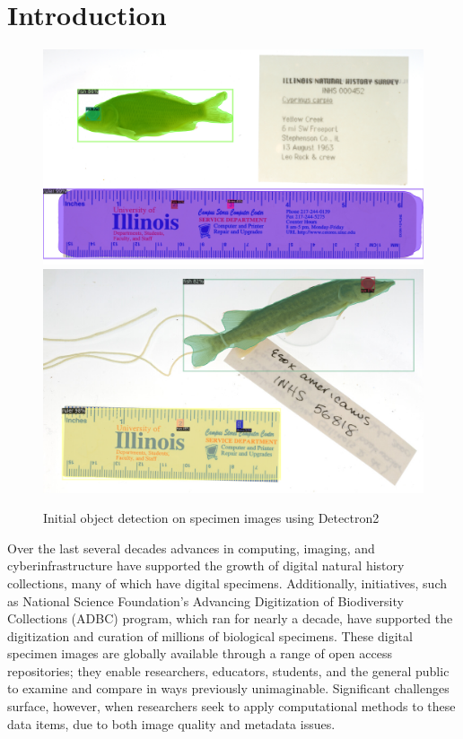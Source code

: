 \documentclass[conference]{IEEEtran}
\begin{document}
\section{Introduction}
\begin{figure}[H]
  \centering
  \includegraphics[width=.45\textwidth]{images/teaser1_crop}
  \hspace{4mm}
  \includegraphics[width=.45\textwidth]{images/teaser2_crop}
  \caption{Initial object detection on specimen images using Detectron2~\cite{wu2019detectron2}}
  \label{fig:teaser}
\end{figure}
Over the last several decades advances in computing, imaging, and cyberinfrastructure have supported the growth of digital natural history collections, many of which have digital specimens. Additionally, initiatives, such as National Science Foundation’s Advancing Digitization of Biodiversity Collections (ADBC) program, which ran for nearly a decade, have supported the digitization and curation of millions  of biological specimens. These digital specimen images are globally available through a range of open access repositories; they enable researchers, educators, students, and the general public to examine and compare in ways previously unimaginable. Significant challenges surface, however, when researchers seek to apply computational methods to these data items, due to both image quality and metadata issues.
 
\end{document}
